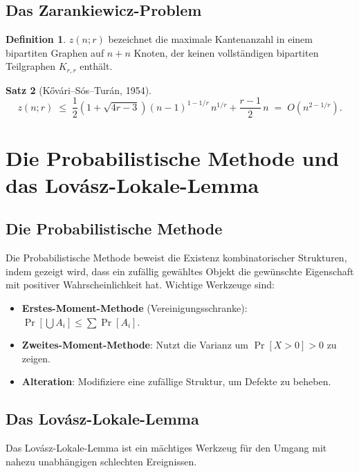 \documentclass[12pt,a4paper]{amsart}
\newtheorem{theorem}{Satz}[section]
\theoremstyle{definition}
\newtheorem{definition}[theorem]{Definition}
\theoremstyle{remark}
\begin{document}
\subsection{Das Zarankiewicz-Problem}

\begin{definition}
$z(n;r)$ bezeichnet die maximale Kantenanzahl in einem bipartiten Graphen auf
$n+n$ Knoten, der keinen vollst\"andigen bipartiten Teilgraphen $K_{r,r}$ enth\"alt.
\end{definition}

\begin{theorem}[K\H{o}v\'ari--S\'os--Tur\'an, 1954]
\[
  z(n;r) \;\le\; \frac{1}{2}\left(1+\sqrt{4r-3}\right)(n-1)^{1-1/r}\,n^{1/r}
  + \frac{r-1}{2}\,n \;=\; O\!\left(n^{2-1/r}\right).
\]
\end{theorem}

\section{Die Probabilistische Methode und das Lov\'asz-Lokale-Lemma}
\label{sec:lll}

\subsection{Die Probabilistische Methode}

Die Probabilistische Methode beweist die Existenz kombinatorischer Strukturen,
indem gezeigt wird, dass ein zuf\"allig gew\"ahltes Objekt die gew\"unschte
Eigenschaft mit positiver Wahrscheinlichkeit hat.  Wichtige Werkzeuge sind:
\begin{itemize}[noitemsep]
  \item \textbf{Erstes-Moment-Methode} (Vereinigungsschranke):
        $\Pr[\bigcup A_i] \le \sum \Pr[A_i]$.
  \item \textbf{Zweites-Moment-Methode}: Nutzt die Varianz um
        $\Pr[X > 0] > 0$ zu zeigen.
  \item \textbf{Alteration}: Modifiziere eine zuf\"allige Struktur, um Defekte zu beheben.
\end{itemize}

\subsection{Das Lov\'asz-Lokale-Lemma}

Das Lov\'asz-Lokale-Lemma \cite{ErdosLovasz1975} ist ein m\"achtiges Werkzeug
f\"ur den Umgang mit nahezu unabh\"angigen schlechten Ereignissen.
\end{document}
